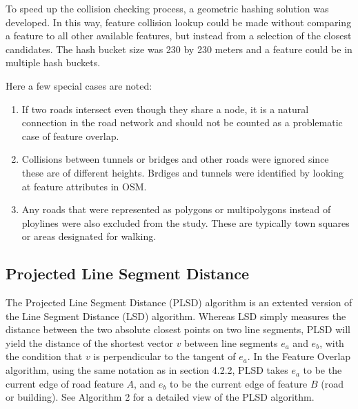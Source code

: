 \documentclass{kththesis}
\begin{document}
To speed up the collision checking process, a geometric hashing solution was developed.
In this way, feature collision lookup could be made without comparing a feature to all other available features, but instead from a selection of the closest candidates.
The hash bucket size was 230 by 230 meters and a feature could be in multiple hash buckets.

Here a few special cases are noted:
\begin{enumerate}
    \item If two roads intersect even though they share a node, it is a natural connection in the road network and should not be counted as a problematic case of feature overlap.
    \item Collisions between tunnels or bridges and other roads were ignored since these are of different heights. Brdiges and tunnels were identified by looking at feature attributes in OSM.
    \item Any roads that were represented as polygons or multipolygons instead of ploylines were also excluded from the study. These are typically town squares or areas designated for walking.
\end{enumerate}

\subsection{Projected Line Segment Distance}

The Projected Line Segment Distance (PLSD) algorithm is an extented version of the Line Segment Distance (LSD) algorithm.
Whereas LSD simply measures the distance between the two absolute closest points on two line segments, PLSD will yield the distance of the shortest vector $v$ between line segments $e_a$ and $e_b$, with the condition that $v$ is perpendicular to the tangent of $e_a$.
In the Feature Overlap algorithm, using the same notation as in section 4.2.2, PLSD takes $e_a$ to be the current edge of road feature $A$, and $e_b$ to be the current edge of feature $B$ (road or building).
See Algorithm 2 for a detailed view of the PLSD algorithm.
\end{document}
